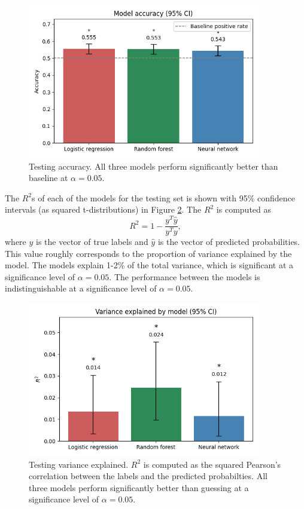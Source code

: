 \documentclass[11pt]{article}
\begin{document}
\begin{figure}[h!]
\centering
\includegraphics[width=4in]{"../output/acc.png"}
\caption{Testing accuracy. All three models perform significantly better than baseline at $\alpha = 0.05$.}
\label{fig:acc}
\end{figure}

The $R^{2}$s of each of the models for the testing set is shown with 95\% confidence intervals (as squared t-distributions) in Figure \ref{fig:r2}. The $R^{2}$ is computed as 
$$R^{2} = 1 - \frac{y^{T}\hat{y}}{y^{T}y},$$
where $y$ is the vector of true labels and $\hat{y}$ is the vector of predicted probabilities. This value roughly corresponds to the proportion of variance explained by the model. The models explain 1-2\% of the total variance, which is significant at a significance level of $\alpha = 0.05$. The performance between the models is indistinguishable at a significance level of $\alpha = 0.05$.

\begin{figure}[h!]
\centering
\includegraphics[width=4in]{"../output/r2.png"}
\caption{Testing variance explained. $R^{2}$ is computed as the squared Pearson's correlation between the labels and the predicted probabilties. All three models perform significantly better than guessing at a significance level of $\alpha = 0.05$.}
\label{fig:r2}
\end{figure}
\end{document}
